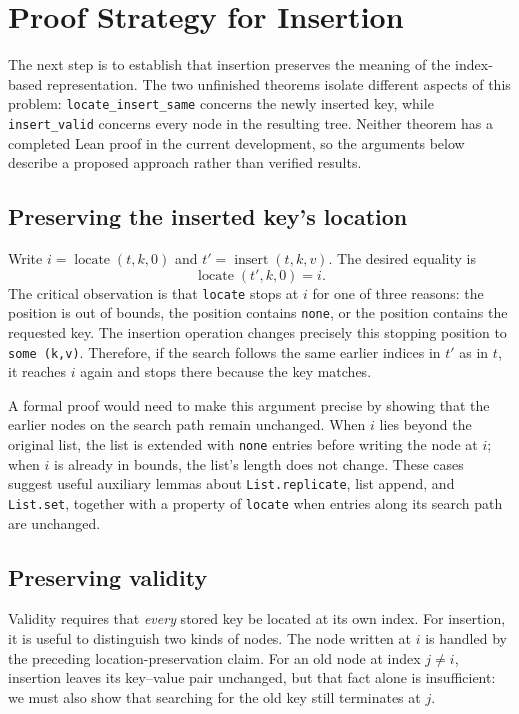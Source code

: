 \documentclass[10pt]{article}
\begin{document}
\section{Proof Strategy for Insertion}

The next step is to establish that insertion preserves the meaning of the index-based representation. The two unfinished theorems isolate different aspects of this problem: \texttt{locate\_insert\_same} concerns the newly inserted key, while \texttt{insert\_valid} concerns every node in the resulting tree. Neither theorem has a completed Lean proof in the current development, so the arguments below describe a proposed approach rather than verified results.

\subsection{Preserving the inserted key's location}

Write $i=\operatorname{locate}(t,k,0)$ and $t'=\operatorname{insert}(t,k,v)$. The desired equality is
\[
    \operatorname{locate}(t',k,0)=i.
\]
The critical observation is that \texttt{locate} stops at $i$ for one of three reasons: the position is out of bounds, the position contains \texttt{none}, or the position contains the requested key. The insertion operation changes precisely this stopping position to \texttt{some (k,v)}. Therefore, if the search follows the same earlier indices in $t'$ as in $t$, it reaches $i$ again and stops there because the key matches.

A formal proof would need to make this argument precise by showing that the earlier nodes on the search path remain unchanged. When $i$ lies beyond the original list, the list is extended with \texttt{none} entries before writing the node at $i$; when $i$ is already in bounds, the list's length does not change. These cases suggest useful auxiliary lemmas about \texttt{List.replicate}, list append, and \texttt{List.set}, together with a property of \texttt{locate} when entries along its search path are unchanged.

\subsection{Preserving validity}

Validity requires that \emph{every} stored key be located at its own index. For insertion, it is useful to distinguish two kinds of nodes. The node written at $i$ is handled by the preceding location-preservation claim. For an old node at index $j\ne i$, insertion leaves its key--value pair unchanged, but that fact alone is insufficient: we must also show that searching for the old key still terminates at $j$.
\end{document}
